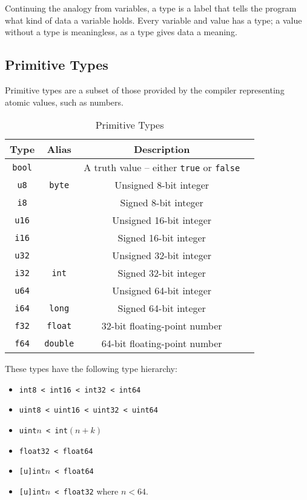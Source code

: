 \documentclass{article}
\begin{document}
    Continuing the analogy from variables, a type is a label that tells the program what kind of data a variable holds.
    Every variable and value has a type; a value without a type is meaningless, as a type gives data a meaning.

    \subsection{Primitive Types}

    Primitive types are a subset of those provided by the compiler representing atomic values, such as numbers.

    \medskip
    \begin{table}[H]
        \begin{tabular}{|c|c|c|l|}
            \hline
            \textbf{Type} & \textbf{Alias} & \textbf{Description} \\
            \hline
            \texttt{bool} & & A truth value -- either \texttt{true} or \texttt{false} \\
            \hline
            \texttt{u8} & \texttt{byte} & Unsigned 8-bit integer \\
            \texttt{i8} & & Signed 8-bit integer \\
            \hline
            \texttt{u16} & & Unsigned 16-bit integer \\
            \texttt{i16} & & Signed 16-bit integer \\
            \hline
            \texttt{u32} & & Unsigned 32-bit integer \\
            \texttt{i32} & \texttt{int} & Signed 32-bit integer \\
            \hline
            \texttt{u64} & & Unsigned 64-bit integer \\
            \texttt{i64} & \texttt{long} & Signed 64-bit integer \\
            \hline
            \texttt{f32} & \texttt{float} & 32-bit floating-point number \\
            \texttt{f64} & \texttt{double} & 64-bit floating-point number \\
            \hline
        \end{tabular}
        \caption{Primitive Types}\label{tab:primitive-types}
    \end{table}


    These types have the following type hierarchy:
    \begin{itemize}
        \item \texttt{int8 < int16 < int32 < int64}
        \item \texttt{uint8 < uint16 < uint32 < uint64}
        \item \texttt{uint\(n\) < int\((n+k)\)}
        \item \texttt{float32 < float64}
        \item \texttt{[u]int\(n\) < float64}
        \item \texttt{[u]int\(n\) < float32} where \(n < 64\).
    \end{itemize}
\end{document}
